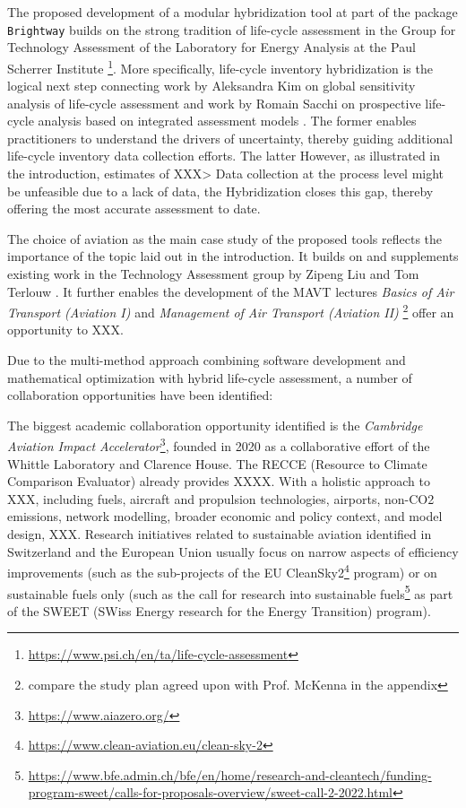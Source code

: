 \documentclass{article}
\begin{document}
    The proposed development of a modular hybridization tool at part of the package \texttt{Brightway} builds on the strong tradition of life-cycle assessment in the Group for Technology Assessment of the Laboratory for Energy Analysis at the Paul Scherrer Institute \footnote{\url{https://www.psi.ch/en/ta/life-cycle-assessment}}. More specifically, life-cycle inventory hybridization is the logical next step connecting work by Aleksandra Kim on global sensitivity analysis of life-cycle assessment \cite{kim_aleksandra-kimgwp_uncertainties_2022}\cite{kim_aleksandra-kimgsa_framework_2021}\cite{paulillo_influential_2021} and work by Romain Sacchi on prospective life-cycle analysis based on integrated assessment models \cite{noauthor_premise_2022}\cite{sacchi_prospective_2022}. The former enables practitioners to understand the drivers of uncertainty, thereby guiding additional life-cycle inventory data collection efforts. The latter 
    However, as illustrated in the introduction, estimates of XXX> Data collection at the process level might be unfeasible due to a lack of data, the 
    Hybridization closes this gap, thereby offering the most accurate assessment to date.
    
    The choice of aviation as the main case study of the proposed tools reflects the importance of the topic laid out in the introduction. It builds on and supplements existing work in the Technology Assessment group by Zipeng Liu and Tom Terlouw \cite{terlouw_large-scale_2022}. It further enables the development of the MAVT lectures \textit{Basics of Air Transport (Aviation I)} and \textit{Management of Air Transport (Aviation II)} \footnote{compare the study plan agreed upon with Prof. McKenna in the appendix} offer an opportunity to XXX.
    
    Due to the multi-method approach combining software development and mathematical optimization with hybrid life-cycle assessment, a number of collaboration opportunities have been identified:
	
	The biggest academic collaboration opportunity identified is the \textit{Cambridge Aviation Impact Accelerator}\footnote{\url{https://www.aiazero.org/}}, founded in 2020 as a collaborative effort of the Whittle Laboratory and Clarence House. The RECCE (Resource to Climate Comparison Evaluator) \cite{noauthor_recce_2022} already provides XXXX. 
 With a holistic approach to XXX, including fuels, aircraft and propulsion technologies, airports, non-CO2 emissions, network modelling, broader economic and policy context, and model design, XXX. Research initiatives related to sustainable aviation identified in Switzerland and the European Union usually focus on narrow aspects of efficiency improvements (such as the sub-projects of the EU CleanSky2\footnote{\url{https://www.clean-aviation.eu/clean-sky-2}} program) or on sustainable fuels only (such as the call for research into sustainable fuels\footnote{\url{https://www.bfe.admin.ch/bfe/en/home/research-and-cleantech/funding-program-sweet/calls-for-proposals-overview/sweet-call-2-2022.html}} as part of the SWEET (SWiss Energy research for the Energy Transition) program).
    
\end{document}
